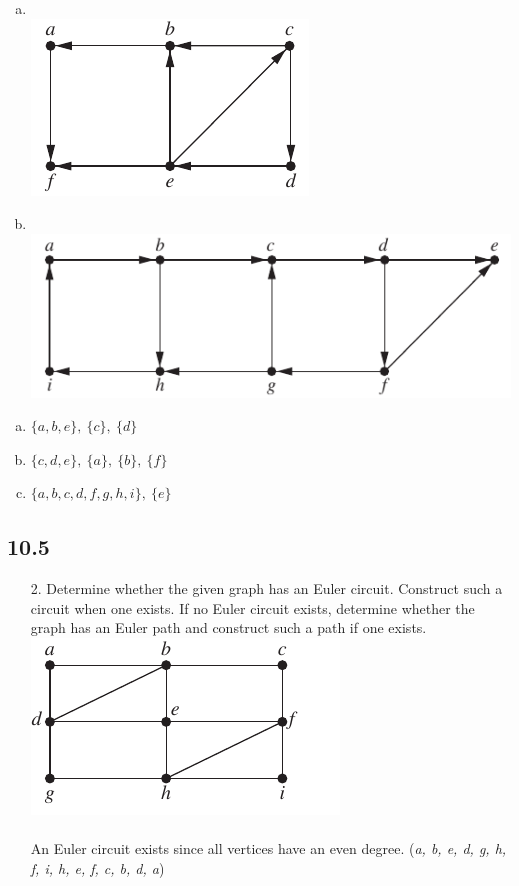 \begin{itemize}
\begin{enumerate}[a.]
      \item \text{} \\ 
      \includegraphics[scale=0.7]{img/10_4_14b_graph.png}
      
      \item \text{} \\ 
      \includegraphics[scale=0.7]{img/10_4_14c_graph.png}
\end{enumerate}
\answer
\begin{enumerate}[a.]
      \item $\{a, b, e\},\ \{c\},\ \{d\}$
      \item $\{c,d,e\},\ \{a\},\ \{b\},\ \{f\}$
      \item $\{a, b, c, d, f, g, h, i\},\ \{e\}$
\end{enumerate}


\end{itemize}

\subsection{10.5}
\begin{itemize}
      \item[2.] Determine whether the given graph has an
Euler circuit. Construct such a circuit when one exists. If
no Euler circuit exists, determine whether the graph has an
Euler path and construct such a path if one exists. \\
\includegraphics[]{img/10_5_2_graph.png} \\
\answer \\
An Euler circuit exists since all vertices have an even degree. (\textit{a, b, e, d, g, h, f, i, h, e, f, c, b, d, a})
\end{itemize}